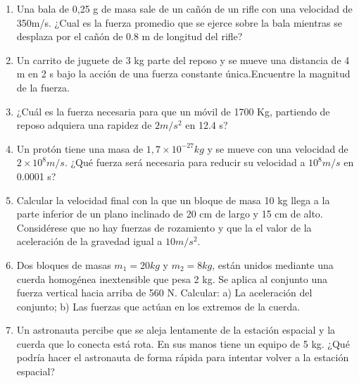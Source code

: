 \begin{enumerate}
\item Una bala de 0,25 g de masa sale de un cañón de un rifle con una velocidad de 350m/s. ¿Cual es la fuerza promedio que se 
ejerce sobre la bala mientras se desplaza por el cañón de 0.8 m de longitud del rifle?

\item Un carrito de juguete de 3 kg parte del reposo y se mueve una distancia de 4 m en 2 s bajo la acción de una fuerza 
constante 
única.Encuentre la magnitud de la fuerza. 

\item ¿Cuál es la fuerza necesaria para que un móvil de 1700 Kg, partiendo de reposo adquiera una rapidez de $2 m/s^2$ en 12.4 s?

\item Un protón tiene una masa de $1,7 \times 10^{−27} kg$ y se mueve con una velocidad de $2 \times 10^8 m/s$. ¿Qué fuerza será 
necesaria para reducir su velocidad a $10^8 m/s$ en 0.0001 s?

\item Calcular la velocidad final con la que un bloque de masa 10 kg llega a la parte inferior de un plano inclinado de 20 cm 
de largo y 15 cm de alto. Considérese que no hay fuerzas de rozamiento y que la el valor de la aceleración de la gravedad
igual a $10 m/s^2$.

\item Dos bloques de masas $m_1 = 20 kg$ y $m_2 = 8 kg$, están unidos mediante una cuerda homogénea inextensible que pesa 2 kg. Se
aplica al conjunto una fuerza vertical hacia arriba de 560 N. Calcular: a) La aceleración del conjunto; b) Las fuerzas que actúan 
en los extremos de la cuerda.

\item Un astronauta percibe que se aleja lentamente de la estación espacial y la cuerda que lo conecta está rota. En sus manos 
tiene un equipo de 5 kg. ¿Qué podría hacer el astronauta de forma rápida para intentar volver a la estación espacial?     

\end{enumerate}
